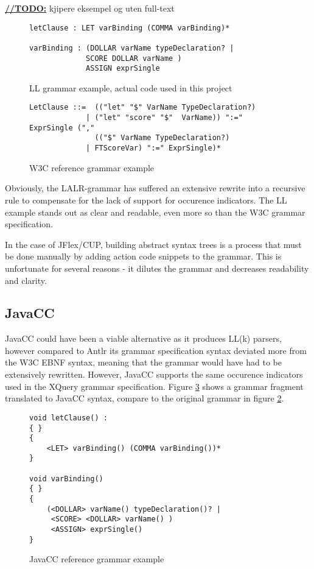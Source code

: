 \underline{\textbf{\LARGE //TODO:}} kjipere eksempel og uten full-text

\begin{figure}[h!]
\begin{Verbatim}
letClause : LET varBinding (COMMA varBinding)*

varBinding : (DOLLAR varName typeDeclaration? | 
             SCORE DOLLAR varName )
             ASSIGN exprSingle
\end{Verbatim}
\caption[LL grammar example]{LL grammar example, actual code used in this project}
\label{code:parsers:ll}
\end{figure}

\begin{figure}[h!]
\begin{Verbatim}
LetClause ::=  (("let" "$" VarName TypeDeclaration?) 
             | ("let" "score" "$"  VarName)) ":=" ExprSingle ("," 
               (("$" VarName TypeDeclaration?) 
             | FTScoreVar) ":=" ExprSingle)*
\end{Verbatim}
\caption{ W3C reference grammar example }
\label{code:parsers:w3c}
\end{figure}

Obviously, the LALR-grammar has suffered an extensive rewrite into a recursive
rule to compensate for the lack of support for occurence indicators. The LL
example stands out as clear and readable, even more so than the W3C
grammar specification.

In the case of JFlex/CUP, building abstract syntax trees is a process that must
be done manually by adding action code snippets to the grammar. This is
unfortunate for several reasons - it dilutes the grammar and decreases
readability and clarity.


\subsection{JavaCC}
JavaCC could have been a viable alternative as it produces LL(k) parsers,
however compared to Antlr its grammar specification syntax deviated more
from the W3C EBNF syntax, meaning that the grammar would have had to be
extensively rewritten. However, JavaCC supports the same occurence indicators
used in the XQuery grammar specification. Figure \ref{code:parsers:javacc} shows
a grammar fragment translated to JavaCC syntax, compare to the original grammar
in figure \ref{code:parsers:w3c}.

\begin{figure}[h!]
\begin{Verbatim}
void letClause() :
{ }
{
    <LET> varBinding() (COMMA varBinding())*
} 

void varBinding()
{ }
{
    (<DOLLAR> varName() typeDeclaration()? | 
     <SCORE> <DOLLAR> varName() )
     <ASSIGN> exprSingle()
}
\end{Verbatim}
\caption{ JavaCC reference grammar example }
\label{code:parsers:javacc}
\end{figure}

